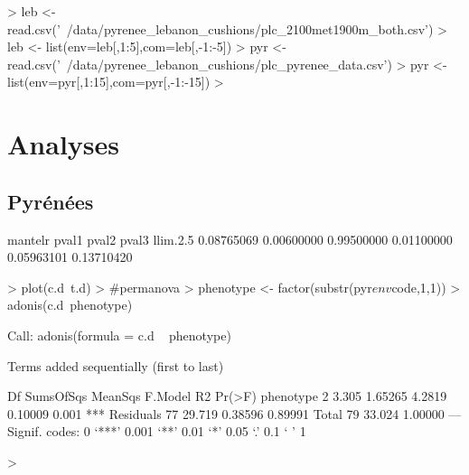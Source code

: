 \documentclass[12pt]{article}
\begin{document}
\begin{Schunk}
\begin{Sinput}
> leb <- read.csv('~/data/pyrenee_lebanon_cushions/plc_2100met1900m_both.csv')
> leb <- list(env=leb[,1:5],com=leb[,-1:-5])
> pyr <- read.csv('~/data/pyrenee_lebanon_cushions/plc_pyrenee_data.csv')
> pyr <- list(env=pyr[,1:15],com=pyr[,-1:-15])
> 
\end{Sinput}
\end{Schunk}

\section{Analyses}

\subsection{Pyr\'{e}n\'{e}es}
\begin{Schunk}
\begin{Soutput}
   mantelr      pval1      pval2      pval3  llim.2.5%
0.08765069 0.00600000 0.99500000 0.01100000 0.05963101 0.13710420 
\end{Soutput}
\begin{Sinput}
> plot(c.d~t.d)
>                                         #permanova
> phenotype <- factor(substr(pyr$env$code,1,1))
> adonis(c.d~phenotype)
\end{Sinput}
\begin{Soutput}
Call:
adonis(formula = c.d ~ phenotype) 

Terms added sequentially (first to last)

          Df SumsOfSqs MeanSqs F.Model      R2 Pr(>F)    
phenotype  2     3.305 1.65265  4.2819 0.10009  0.001 ***
Residuals 77    29.719 0.38596         0.89991           
Total     79    33.024                 1.00000           
---
Signif. codes:  0 ‘***’ 0.001 ‘**’ 0.01 ‘*’ 0.05 ‘.’ 0.1 ‘ ’ 1 
\end{Soutput}
\begin{Sinput}
> 
\end{Sinput}
\end{Schunk}
\end{document}
